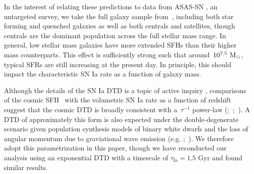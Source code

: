 \documentclass[ms.tex]{subfiles}
\begin{document}
In the interest of relating these predictions to data from ASAS-SN
\citep{Shappee2014, Kochanek2017}, an untargeted survey, we take the full
galaxy sample from~\um, including both star forming and quenched galaxies as
well as both centrals and satellites, though centrals are the dominant
population across the full stellar mass range.
In general, low stellar mass galaxies have more extended SFHs than their
higher mass counterparts.
This effect is sufficiently strong such that around~$10^{7.5}~\text{M}_\odot$, typical
SFRs are still increasing at the present day.
In principle, this should impact the characteristic SN Ia rate as a function of
galaxy mass.
\par
Although the details of the SN Ia DTD is a topic of active inquiry
\citep[e.g.][]{Greggio2005, Strolger2020, Freundlich2021}, comparisons of the
cosmic SFH~\citep[e.g.][]{Hopkins2006, Davies2016, Madau2014, Madau2017,
Driver2018} with the volumetric SN Ia rate as a function of redshift suggest
that the cosmic DTD is broadly consistent with a~$\tau^{-1}$ power-law
(\citealp{Maoz2012a};~\citealp*{Maoz2012b};~\citealp{Graur2013, Graur2014}).
A DTD of approximately this form is also expected under the double-degenerate
scenario given population synthesis models of binary white dwarfs and the loss
of angular momentum due to graviational wave emission (e.g.
\citealp{Mennekens2010};~\citealp*{Maoz2014}).
We therefore adopt this parametrization in this paper, though we have
reconducted our analysis using an exponential DTD with a timescale of
$\tau_\text{Ia} = 1.5$ Gyr and found similar results.
\end{document}
